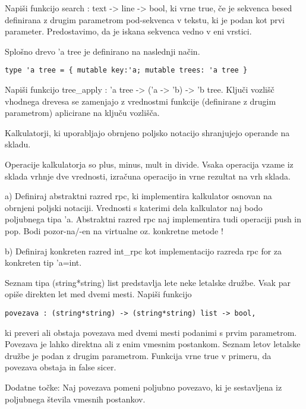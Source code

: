 \begin{ex}
Napi\v si funkcijo search : text -> line -> bool, ki vrne true, \v ce je sekvenca besed definirana z drugim parametrom pod-sekvenca v tekstu, ki je podan kot prvi parameter. Predostavimo, da je iskana sekvenca vedno v eni vrstici. 


\end{ex} \begin{ex}
Splo\v sno drevo 'a tree je definirano na naslednji na\v cin.
\begin{verbatim}
type 'a tree = { mutable key:'a; mutable trees: 'a tree }
\end{verbatim}

Napi\v si funkcijo tree\_apply : 'a tree -> ('a -> 'b) -> 'b tree. Klju\v ci vozli\v s\v c vhodnega drevesa se zamenjajo z vrednostmi funkcije (definirane z drugim parametrom) aplicirane na klju\v cu vozli\v s\v ca. 

\end{ex} 
\begin{ex}
Kalkulatorji, ki uporabljajo obrnjeno poljsko notacijo shranjujejo operande na skladu. 

Operacije kalkulatorja so plus, minus, mult in divide. Vsaka operacija vzame iz sklada vrhnje dve vrednosti, izra\v cuna operacijo in vrne rezultat na vrh sklada. 

a) Definiraj abstraktni razred rpc, ki implementira kalkulator osnovan na obrnjeni poljski notaciji. Vrednosti s katerimi dela kalkulator naj bodo poljubnega tipa 'a. Abstraktni razred rpc naj implementira tudi operaciji push in pop. Bodi pozor-na/-en na virtualne oz. konkretne metode !

b) Definiraj konkreten razred int\_rpc kot implementacijo razreda rpc for za konkreten tip 'a=int.


\end{ex} \begin{ex}
Seznam tipa (string*string) list predstavlja lete neke letalske dru\v zbe. Vsak par opi\v se direkten let med dvemi mesti. Napi\v si funkcijo 
\begin{verbatim}
povezava : (string*string) -> (string*string) list -> bool,
\end{verbatim}

ki preveri ali obstaja povezava med dvemi mesti podanimi s prvim parametrom. Povezava je lahko direktna ali z enim vmesnim postankom. Seznam letov letalske dru\v zbe je podan z drugim parametrom. Funkcija vrne true v primeru, da povezava obstaja in false sicer.

Dodatne to\v cke: 
Naj povezava pomeni poljubno povezavo, ki je sestavljena iz poljubnega \v stevila vmesnih postankov.


\end{ex} 
